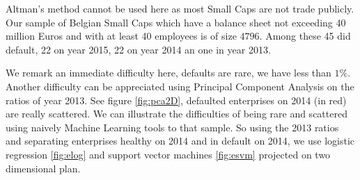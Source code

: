 \documentclass[DIV=calc, paper=a4, fontsize=11pt, twocolumn]{scrartcl}
\begin{document}
Altman's method cannot be used here as most Small Caps are not trade publicly.
Our sample of Belgian Small Caps which have a balance sheet not exceeding 40 million Euros and with at least 40 employees is of size $4796$. 
Among these 45 did default, 22 on year 2015, 22 on year 2014 an one in year 2013.

We remark an immediate difficulty here, defaults are rare, we have less than $1\%$. Another difficulty can be
appreciated using Principal Component Analysis on the ratios of year 2013. See figure \ref{fig:pca2D}, defaulted enterprises on 2014 (in red) 
are really scattered.
We can illustrate the difficulties of being rare and scattered using naively Machine Learning tools to that sample.
So using the 2013 ratios and separating enterprises healthy on 2014 and in default on 2014, we use logistic regression
\ref{fig:elog} and support vector machines \ref{fig:esvm} projected on two dimensional plan.
\end{document}

